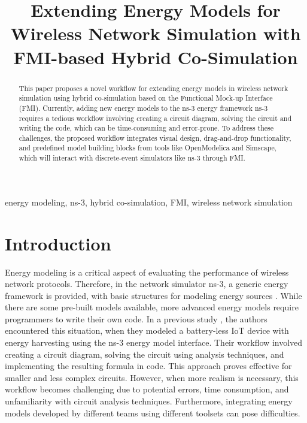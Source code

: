\documentclass[conference]{IEEEtran}
\def\ns3{ns-3}
\begin{document}
\title{Extending Energy Models for Wireless Network Simulation with FMI-based Hybrid Co-Simulation}

\author{
}

\maketitle

\begin{abstract}
This paper proposes a novel workflow for extending energy models in wireless network simulation using hybrid co-simulation based on the Functional Mock-up Interface (FMI). Currently, adding new energy models to the \ns3 energy framework \ns3 requires a tedious workflow involving creating a circuit diagram, solving the circuit and writing the code, which can be time-consuming and error-prone. To address these challenges, the proposed workflow integrates visual design, drag-and-drop functionality, and predefined model building blocks from tools like OpenModelica and Simscape, which will interact with discrete-event simulators like \ns3 through FMI.
\end{abstract}

\begin{IEEEkeywords}
energy modeling, \ns3, hybrid co-simulation, FMI, wireless network simulation 
\end{IEEEkeywords}

\section{Introduction}

Energy modeling is a critical aspect of evaluating the performance of wireless network protocols.
Therefore, in the network simulator \ns3, a generic energy framework is provided, with basic structures for modeling energy sources \cite{wu2012energy}.
While there are some pre-built models available, more advanced energy models require programmers to write their own code.
In a previous study \cite{capuzzo2021ns}, the authors encountered this situation, when they modeled a battery-less IoT device with energy harvesting using the \ns3 energy model interface.
Their workflow involved creating a circuit diagram, solving the circuit using analysis techniques, and implementing the resulting formula in code. 
This approach proves effective for smaller and less complex circuits.
However, when more realism is necessary, this workflow becomes challenging due to potential errors, time consumption, and unfamiliarity with circuit analysis techniques. Furthermore, integrating energy models developed by different teams using different toolsets can pose difficulties.
\end{document}
